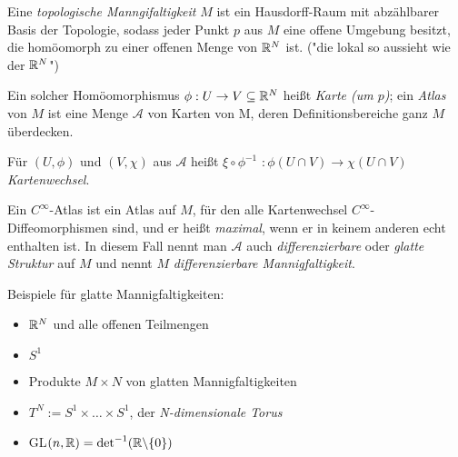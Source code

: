 ﻿\begin{defi}
Eine \emph{topologische Manngifaltigkeit} $M$ ist ein Hausdorff-Raum mit abzählbarer Basis der Topologie, sodass jeder Punkt $p$ aus $M$ eine offene Umgebung besitzt, die homöomorph zu einer offenen Menge von $\mathbb R^N$ ist. ("die lokal so aussieht wie der $\mathbb R^N$")
\end{defi}

\begin{defi}
Ein solcher Homöomorphismus $\phi: U \to V \subseteq \mathbb R^N$ heißt \emph{Karte (um $p$)}; ein \emph{Atlas} von $M$ ist eine Menge $\mathcal{A}$ von Karten von M, deren Definitionsbereiche ganz $M$ überdecken.
\end{defi}

\begin{defi}[Kartenwechsel]
Für $(U, \phi)$ und $(V, \chi)$ aus $\mathcal{A}$ heißt \underline{$\xi \circ \phi^{-1}$} $: \phi(U \cap V) \to \chi(U \cap V)$ \emph{Kartenwechsel}.
\end{defi}

\begin{defi}
Ein $C^{\infty}$-Atlas ist ein Atlas auf $M$, für den alle Kartenwechsel $C^{\infty}$-Diffeomorphismen sind, und er heißt \emph{maximal}, wenn er in keinem anderen echt enthalten ist.
In diesem Fall nennt man $\mathcal{A}$ auch \emph{differenzierbare} oder \emph{glatte Struktur} auf $M$ und nennt $M$ \emph{differenzierbare Mannigfaltigkeit}.
\end{defi}

\begin{bsp} Beispiele für glatte Mannigfaltigkeiten:
\begin{itemize}
	\item $\mathbb R^N$ und alle offenen Teilmengen
	\item $S^1$
	\item Produkte $M \times N$ von glatten Mannigfaltigkeiten
	\item $T^N := S^1 \times \dots \times S^1$, der \emph{N-dimensionale Torus}
	\item GL$(n, \mathbb R) = \det^{-1}(\mathbb R \backslash \{0\})$
\end{itemize}	
\end{bsp}
